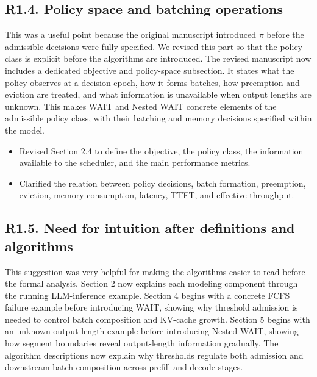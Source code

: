 \subsection*{R1.4. Policy space and batching operations}


\response This was a useful point because the original manuscript introduced \(\pi\) before the admissible decisions were fully specified. We revised this part so that the policy class is explicit before the algorithms are introduced. The revised manuscript now includes a dedicated objective and policy-space subsection. It states what the policy observes at a decision epoch, how it forms batches, how preemption and eviction are treated, and what information is unavailable when output lengths are unknown. This makes WAIT and Nested WAIT concrete elements of the admissible policy class, with their batching and memory decisions specified within the model.

\changes
\begin{itemize}
    \item Revised Section 2.4 to define the objective, the policy class, the information available to the scheduler, and the main performance metrics.
    \item Clarified the relation between policy decisions, batch formation, preemption, eviction, memory consumption, latency, TTFT, and effective throughput.
\end{itemize}

\subsection*{R1.5. Need for intuition after definitions and algorithms}


\response This suggestion was very helpful for making the algorithms easier to read before the formal analysis. Section 2 now explains each modeling component through the running LLM-inference example. Section 4 begins with a concrete FCFS failure example before introducing WAIT, showing why threshold admission is needed to control batch composition and KV-cache growth. Section 5 begins with an unknown-output-length example before introducing Nested WAIT, showing how segment boundaries reveal output-length information gradually. The algorithm descriptions now explain why thresholds regulate both admission and downstream batch composition across prefill and decode stages.

